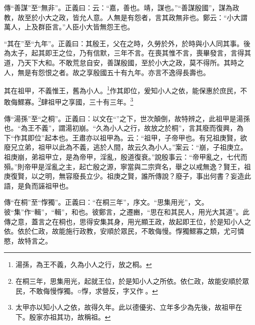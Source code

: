 {\noindent\zhuan{}\fzbyks 傳“善謀”至“無非”。正義曰：云：“嘉，善也。靖，謀也。”“善謀殷國”，謀為政教，故至於小大之政，皆允人意。人無是有怨者，言其政無非也。鄭云：“小大謂萬人，上及群臣言。”人臣小大皆無怨王也。 \par}

{\noindent\shu{}\fzkt “其在”至“九年”。正義曰：其殷王，父在之時，久勞於外，於時與小人同其事。後為太子，起其即王之位，乃有信默，三年不言。在喪其惟不言，喪畢發言，言得其道，乃天下大和。不敢荒怠自安，善謀殷國，至於小大之政，莫不得所。其時之人，無是有怨恨之者。故之享殷國五十有九年。亦言不逸得長壽也。 \par}

其在祖甲，不義惟王，舊為小人。\footnote{湯孫，為王不義，久為小人之行，放之桐。}作其即位，爰知小人之依，能保惠於庶民，不敢侮鰥寡。\footnote{在桐三年，思集用光，起就王位，於是知小人之所依。依仁政，故能安順於眾民，不敢侮慢惸獨。○惸，求營反，字又作𦬮。}肆祖甲之享國，三十有三年。\footnote{太甲亦以知小人之依，故得久年。此以德優劣、立年多少為先後，故祖甲在下。殷家亦祖其功，故稱祖。}


{\noindent\zhuan{}\fzbyks 傳“湯孫”至“之桐”。正義曰：以文在“”之下，世次顛倒，故特辨之，此祖甲是湯孫也。“為王不義”，謂湯初崩。“久為小人之行，故放之於桐”，言其廢而復興，為下“作其即位”起本也。王肅亦以祖甲為。云：“祖甲，子帝甲也。有兄祖庚賢，欲廢兄立弟，祖甲以此為不義，逃於人間，故云久為小人。”案云：“崩，子祖庚立。祖庚崩，弟祖甲立，是為帝甲，淫亂，殷道復衰。”說殷事云：“帝甲亂之，七代而殞。”則帝甲是淫亂之主，起亡殷之源，寧當與二宗齊名，舉之以戒無逸？賢王，祖庚復賢，以之明，無容廢長立少。祖庚之賢，誰所傳說？廢子，事出何書？妄造此語，是負而誣祖甲也。 \par}

{\noindent\zhuan{}\fzbyks 傳“在桐”至“惸獨”。正義曰：“在桐三年”，序文。“思集用光”，文。彼“集”作“輯”，“輯”，和也。彼鄭言，之遷豳，“思在和其民人，用光大其道”。此傳之意，蓋言之在桐也，思得安集其身，用光顯王政，故起即王位，於是知小人之依。依於仁政，故能施行政教，安順於眾民，不敢侮慢。惸獨鰥寡之類，尤可憐愍，故特言之。 \par}

